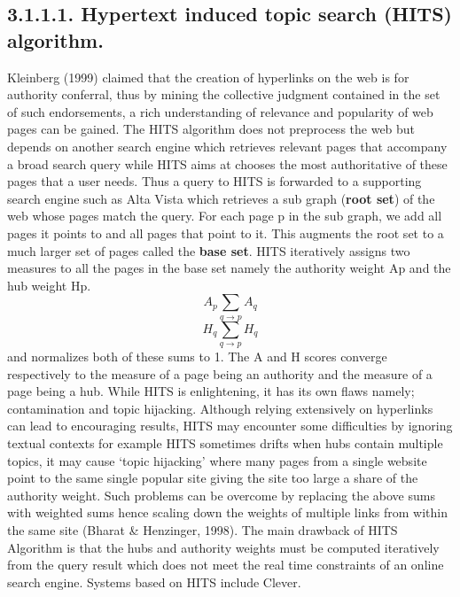 \documentclass{article}
\begin{document}
\subsection*{3.1.1.1. Hypertext induced topic search (HITS) algorithm.}
Kleinberg (1999) claimed that the creation of hyperlinks on the web is for authority conferral, thus by mining the collective judgment contained in the set of such endorsements, a rich understanding of relevance and popularity of web pages can be gained. The HITS algorithm does not preprocess the web but depends on another search engine which retrieves relevant pages that accompany a broad search query while HITS aims at chooses the most authoritative of these pages that a user needs. Thus a query to HITS is forwarded to a supporting search engine such as Alta Vista which retrieves a sub graph (\textbf{root set}) of the web whose pages match the query. For each page p in the sub graph, we add all pages it points to and all pages that point to it. This augments the root set to a much larger set of pages called the\textbf{ base set}. HITS iteratively assigns two measures to all the pages in the base set namely the authority weight Ap and the hub weight Hp. 
\newline \begin{equation}
A_{p}\sum_{q \rightarrow p} A_{q} \end{equation} \begin{equation} H_{q}\sum_{q \rightarrow p} H _{q} \end{equation}  and normalizes both of these sums to 1. The A and H scores converge respectively to the measure of a page being an authority and the measure of a page being a hub. 
While HITS is enlightening, it has its own flaws namely; contamination and topic hijacking.
Although relying extensively on hyperlinks can lead to encouraging results, HITS may encounter some difficulties by ignoring textual contexts for example HITS sometimes drifts when hubs contain multiple topics, it may cause ‘topic hijacking’ where many pages from a single website point to the same single popular site giving the site too large a share of the authority weight. Such problems can be overcome by replacing the above sums with weighted sums hence scaling down the weights of multiple links from within the same site (Bharat \& Henzinger, 1998).  The main drawback of HITS Algorithm is that the hubs and authority weights must be computed iteratively from the query result which does not meet the real time constraints of an online search engine. Systems based on HITS include Clever. 
\end{document}
